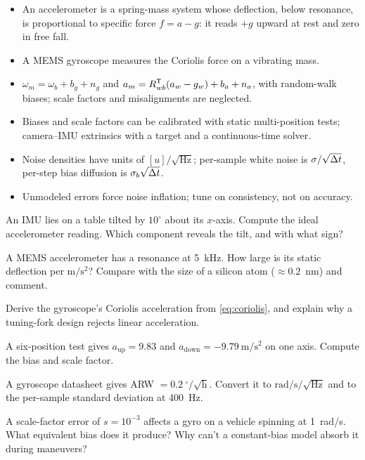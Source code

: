 \begin{takeaways}
\begin{itemize}
  \item An accelerometer is a spring-mass system whose deflection, below resonance, is proportional to specific force $f = a - g$: it reads $+g$ upward at rest
        and zero in free fall.
  \item A MEMS gyroscope measures the Coriolis force on a vibrating mass.
  \item $\omega_m = \omega_b + b_g + n_g$ and $a_m = R_{wb}^{\mathsf{T}}(a_w - g_w) + b_a + n_a$, with random-walk biases; scale factors and misalignments are neglected.
  \item Biases and scale factors can be calibrated with static multi-position tests; camera--IMU extrinsics with a target and a continuous-time solver.
  \item Noise densities have units of $[u]/\sqrt{\mathrm{Hz}}$; per-sample white noise is $\sigma/\sqrt{{\Delta t}}$, per-step bias diffusion is $\sigma_b\sqrt{{\Delta t}}$.
  \item Unmodeled errors force noise inflation; tune on consistency, not on accuracy.
\end{itemize}
\end{takeaways}

\begin{exercises}
  \item An IMU lies on a table tilted by $10^\circ$ about its $x$-axis. Compute the ideal accelerometer reading. Which component reveals the tilt, and with what sign?
  \item A MEMS accelerometer has a resonance at 5~kHz. How large is its static deflection per $\mathrm{m/s^2}$? Compare with the size of a silicon atom
        ($\approx 0.2$~nm) and comment.
  \item Derive the gyroscope's Coriolis acceleration from \eqref{eq:coriolis}, and explain why a tuning-fork design rejects linear acceleration.
  \item A six-position test gives $a_{\mathrm{up}} = 9.83$ and $a_{\mathrm{down}} = -9.79~\mathrm{m/s^2}$ on one axis. Compute the bias and scale factor.
  \item A gyroscope datasheet gives ARW $= 0.2\ ^\circ/\sqrt{\mathrm{h}}$. Convert it to $\mathrm{rad/s/\sqrt{Hz}}$ and to the per-sample standard deviation at 400~Hz.
  \item A scale-factor error of $s = 10^{-3}$ affects a gyro on a vehicle spinning at 1~rad/s. What equivalent bias does it produce? Why can't a constant-bias model
        absorb it during maneuvers?
\end{exercises}

